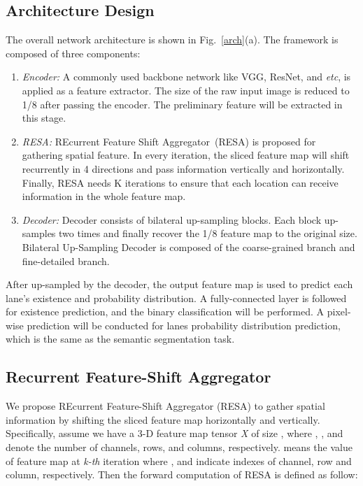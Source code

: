 \documentclass[letterpaper]{article} \usepackage{aaai21}  \usepackage{times}  \usepackage{helvet} \usepackage{courier}  \usepackage[hyphens]{url}  \usepackage{graphicx} \urlstyle{rm} \def\UrlFont{\rm}  \usepackage{natbib}  \usepackage{caption} \frenchspacing  \setlength{\pdfpagewidth}{8.5in}  \setlength{\pdfpageheight}{11in}  \usepackage{amsmath}
\begin{document}
\subsection{Architecture Design}
The overall network architecture is shown in Fig.~\ref{arch}(a). The framework is composed of three components:
\begin{enumerate}
    \item \textit{Encoder:} A commonly used backbone network like VGG, ResNet, and \emph{etc}, is applied as a feature extractor. The size of the raw input image is reduced to 1/8 after passing the encoder. The preliminary feature will be extracted in this stage. 
    \item \textit{RESA:} REcurrent Feature Shift Aggregator~(RESA) is proposed for gathering spatial feature. In every iteration, the sliced feature map will shift recurrently in 4 directions and pass information vertically and horizontally. Finally, RESA needs K iterations to ensure that each location can receive information in the whole feature map.
    \item \textit{Decoder:} Decoder consists of bilateral up-sampling blocks. Each block up-samples two times and finally recover the 1/8 feature map to the original size. Bilateral Up-Sampling Decoder is composed of the coarse-grained branch and fine-detailed branch.
\end{enumerate}

After up-sampled by the decoder, the output feature map is used to predict each lane's existence and probability distribution. A fully-connected layer is followed for existence prediction, and the binary classification will be performed. A pixel-wise prediction will be conducted for lanes probability distribution prediction, which is the same as the semantic segmentation task.

\subsection{Recurrent Feature-Shift Aggregator}
\label{resa_sec}
We propose REcurrent Feature-Shift Aggregator (RESA) to gather spatial information by shifting the sliced feature map horizontally and vertically. Specifically, assume we have a 3-D feature map tensor \textit{X} of size , where , , and  denote the number of channels, rows, and columns, respectively.  means the value of feature map  at \textit{k-th} iteration where ,  and  indicate indexes of channel, row and column, respectively. Then the forward computation of RESA is defined as follow:
\end{document}

